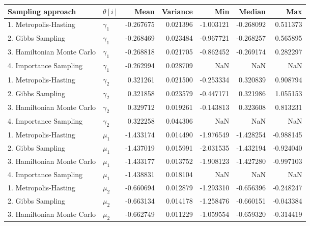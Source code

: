 \documentclass{article}
\begin{document}
\begin{table}[H]
  \begin{center}
    \begin{tabular}{llrrrrr}
 \textbf{Sampling approach} & $\theta[i]$ &  \textbf{Mean} & \textbf{Variance} & \textbf{Min} & \textbf{Median} & \textbf{Max} \\
      \midrule
           1. Metropolis-Hasting &  $\gamma_1$ & -0.267675 & 0.021396 & -1.003121 & -0.268092 &  0.511373 \\
               2. Gibbs Sampling &  $\gamma_1$ & -0.268469 & 0.023484 & -0.967721 & -0.268257 &  0.565895 \\
      3. Hamiltonian Monte Carlo &  $\gamma_1$ & -0.268818 & 0.021705 & -0.862452 & -0.269174 &  0.282297 \\
          4. Importance Sampling &  $\gamma_1$ & -0.262994 & 0.028709 &       NaN &       NaN &       NaN \\
          \midrule
           1. Metropolis-Hasting &  $\gamma_2$ &  0.321261 & 0.021500 & -0.253334 &  0.320839 &  0.908794 \\
               2. Gibbs Sampling &  $\gamma_2$ &  0.321858 & 0.023579 & -0.447171 &  0.321986 &  1.055153 \\
      3. Hamiltonian Monte Carlo &  $\gamma_2$ &  0.329712 & 0.019261 & -0.143813 &  0.323608 &  0.813231 \\
          4. Importance Sampling &  $\gamma_2$ &  0.322258 & 0.044306 &       NaN &       NaN &       NaN \\
\midrule
           1. Metropolis-Hasting &   $\mu_1$ & -1.433174 & 0.014490 & -1.976549 & -1.428254 & -0.988145 \\
               2. Gibbs Sampling &   $\mu_1$ & -1.437019 & 0.015991 & -2.031535 & -1.432194 & -0.924040 \\
      3. Hamiltonian Monte Carlo &   $\mu_1$ & -1.433177 & 0.013752 & -1.908123 & -1.427280 & -0.997103 \\
          4. Importance Sampling &   $\mu_1$ & -1.438831 & 0.018104 &       NaN &       NaN &       NaN \\
\midrule
           1. Metropolis-Hasting &   $\mu_2$ & -0.660694 & 0.012879 & -1.293310 & -0.656396 & -0.248247 \\
               2. Gibbs Sampling &   $\mu_2$ & -0.663134 & 0.014178 & -1.258476 & -0.660151 & -0.043384 \\
      3. Hamiltonian Monte Carlo &   $\mu_2$ & -0.662749 & 0.011229 & -1.059554 & -0.659320 & -0.314419 \\

\end{tabular}
\end{center}
\end{table}
\end{document}
